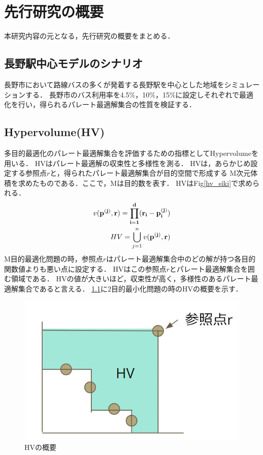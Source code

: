 \documentclass[main]{subfiles}
\begin{document}
    \chapter{先行研究の概要}
    本研究内容の元となる，先行研究の概要をまとめる\cite{senkoukenkyu}．

    \section{長野駅中心モデルのシナリオ}
    長野市において路線バスの多くが発着する長野駅を中心とした地域をシミュレーションする．
    長野市のバス利用率を4.5\%，10\%，15\%に設定しそれぞれで最適化を行い，得られるパレート最適解集合の性質を検証する．

    \section{Hypervolume(HV)}
    多目的最適化のパレート最適解集合を評価するための指標としてHypervolumeを用いる\cite{hv}．
    HVはパレート最適解の収束性と多様性を測る．
    HVは，あらかじめ設定する参照点\boldmath$r$と，得られたパレート最適解集合が目的空間で形成する
    M次元体積を求めたものである．ここで，Mは目的数を表す．
    HVはFig\ref{hv_siki}で求められる．
    \begin{align}
        v(\bf{p}^{(j)}, \bf r) = \prod_{i=1}^d (r_i - p_i^{(j)}) \\
        HV = \bigcup_{j=1}^n v(\bf{p}^{(j)}, \bf r)
        \label{hv_siki}
    \end{align}
    M目的最適化問題の時，参照点\boldmath$r$はパレート最適解集合中のどの解が持つ各目的関数値よりも悪い点に設定する．
    HVはこの参照点\boldmath$r$とパレート最適解集合を囲む領域である．
    HVの値が大きいほど，収束性が高く，多様性のあるパレート最適解集合であると言える．
    \ref{hv_image}に2目的最小化問題の時のHVの概要を示す．

    \begin{figure}
        \centering
        \includegraphics[width=\linewidth]{figures/hv_image.png}
        \caption{HVの概要}
        \label{hv_image}
    \end{figure}
\end{document}
